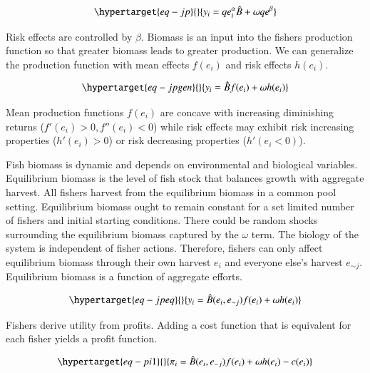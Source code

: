 \documentclass[
  super,
  preprint,
  3p]{elsarticle}
\theoremstyle{plain}
\theoremstyle{plain}
\theoremstyle{remark}
\begin{document}
\begin{equation}\protect\hypertarget{eq-jp}{}{
\begin{aligned}
y_i=qe_i^\alpha\hat{B}+\omega qe^\beta
\end{aligned}
}\label{eq-jp}\end{equation}

Risk effects are controlled by \(\beta\). Biomass is an input into the
fishers production function so that greater biomass leads to greater
production. We can generalize the production function with mean effects
\(f(e_i)\) and risk effects \(h(e_i)\).

\begin{equation}\protect\hypertarget{eq-jpgen}{}{
\begin{aligned}
y_i=\hat{B}f(e_i)+\omega h(e_i)
\end{aligned}
}\label{eq-jpgen}\end{equation}

Mean production functions \(f(e_i)\) are concave with increasing
diminishing returns (\(f'(e_i)>0,f''(e_i)<0\)) while risk effects may
exhibit risk increasing properties (\(h'(e_i)>0\)) or risk decreasing
properties (\(h'(e_i<0)\)).

Fish biomass is dynamic and depends on environmental and biological
variables. Equilibrium biomass is the level of fish stock that balances
growth with aggregate harvest. All fishers harvest from the equilibrium
biomass in a common pool setting. Equilibrium biomass ought to remain
constant for a set limited number of fishers and initial starting
conditions. There could be random shocks surrounding the equilibrium
biomass captured by the \(\omega\) term. The biology of the system is
independent of fisher actions. Therefore, fishers can only affect
equilibrium biomass through their own harvest \(e_i\) and everyone
else's harvest \(e_{\sim j}\). Equilibrium biomass is a function of
aggregate efforts.

\begin{equation}\protect\hypertarget{eq-jpeq}{}{
\begin{aligned}
y_i=\hat{B}(e_i,e_{\sim j})f(e_i)+\omega h(e_i)
\end{aligned}
}\label{eq-jpeq}\end{equation}

Fishers derive utility from profits. Adding a cost function that is
equivalent for each fisher yields a profit function.

\begin{equation}\protect\hypertarget{eq-pi1}{}{
\begin{aligned}
\pi_i=\hat{B}(e_i,e_{\sim j})f(e_i)+\omega h(e_i)-c(e_i)
\end{aligned}
}\label{eq-pi1}\end{equation}
\end{document}

